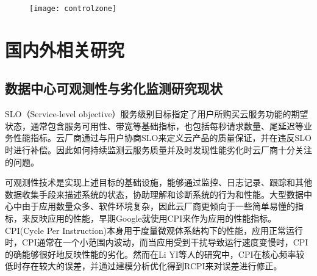 \begin{figure}[!htbp]
    \centering
    \texttt{[image: controlzone]}
    \label{fig:controlzone}
\end{figure}

\section{国内外相关研究}


\subsection{数据中心可观测性与劣化监测研究现状}


SLO（Service-level objective）服务级别目标指定了用户所购买云服务功能的期望状态，通常包含服务可用性、带宽等基础指标，也包括每秒请求数量、尾延迟等业务性能指标。云厂商通过与用户协商SLO来定义云产品的质量保证，并在违反SLO时进行补偿。因此如何持续监测云服务质量并及时发现性能劣化时云厂商十分关注的问题。

可观测性技术是实现上述目标的基础设施，能够通过监控、日志记录、跟踪和其他数据收集手段来描述系统的状态，协助理解和诊断系统的行为和性能。大型数据中心中由于应用数量众多、软件环境复杂，因此云厂商更倾向于一些简单易懂的指标，来反映应用的性能，早期Google就使用CPI来作为应用的性能指标\citep{zhang2013cpi2}。CPI(Cycle Per Instruction)本身用于度量微观体系结构下的性能，应用正常运行时，CPI通常在一个小范围内波动，而当应用受到干扰导致运行速度变慢时，CPI的确能够很好地反映性能的劣化。然而在Li YI等人的研究中\citep{yi2020cpi}，CPI在核心频率较低时存在较大的误差，并通过建模分析优化得到RCPI来对误差进行修正。

